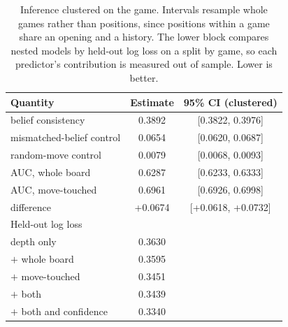 \begin{table}[t]
\centering\small
\caption{Inference clustered on the game. Intervals resample whole
games rather than positions, since positions within a game share an
opening and a history. The lower block compares nested models by held-out
log loss on a split by game, so each predictor's contribution is measured
out of sample. Lower is better.}
\label{tab:stats}
\begin{tabular}{lcc}
\toprule
Quantity & Estimate & 95\% CI (clustered) \\
\midrule
belief consistency & 0.3892 & [0.3822, 0.3976] \\
\quad mismatched-belief control & 0.0654 & [0.0620, 0.0687] \\
\quad random-move control & 0.0079 & [0.0068, 0.0093] \\
AUC, whole board & 0.6287 & [0.6233, 0.6333] \\
AUC, move-touched & 0.6961 & [0.6926, 0.6998] \\
\quad difference & +0.0674 & [+0.0618, +0.0732] \\
\midrule
Held-out log loss & \multicolumn{2}{c}{} \\
depth only & 0.3630 & \\
\quad $+$ whole board & 0.3595 & \\
\quad $+$ move-touched & 0.3451 & \\
\quad $+$ both & 0.3439 & \\
\quad $+$ both and confidence & 0.3340 & \\
\bottomrule
\end{tabular}
\end{table}
